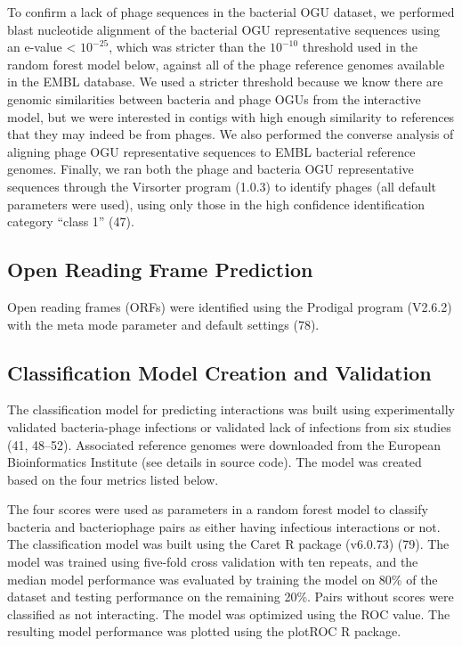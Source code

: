 \documentclass[12pt,]{article}
\begin{document}
To confirm a lack of phage sequences in the bacterial OGU dataset, we
performed blast nucleotide alignment of the bacterial OGU representative
sequences using an e-value \textless{} \(10^{-25}\), which was stricter
than the \(10^{-10}\) threshold used in the random forest model below,
against all of the phage reference genomes available in the EMBL
database. We used a stricter threshold because we know there are genomic
similarities between bacteria and phage OGUs from the interactive model,
but we were interested in contigs with high enough similarity to
references that they may indeed be from phages. We also performed the
converse analysis of aligning phage OGU representative sequences to EMBL
bacterial reference genomes. Finally, we ran both the phage and bacteria
OGU representative sequences through the Virsorter program (1.0.3) to
identify phages (all default parameters were used), using only those in
the high confidence identification category ``class 1'' (47).

\subsection{Open Reading Frame
Prediction}\label{open-reading-frame-prediction}

Open reading frames (ORFs) were identified using the Prodigal program
(V2.6.2) with the meta mode parameter and default settings (78).

\subsection{Classification Model Creation and
Validation}\label{classification-model-creation-and-validation}

The classification model for predicting interactions was built using
experimentally validated bacteria-phage infections or validated lack of
infections from six studies (41, 48--52). Associated reference genomes
were downloaded from the European Bioinformatics Institute (see details
in source code). The model was created based on the four metrics listed
below.

The four scores were used as parameters in a random forest model to
classify bacteria and bacteriophage pairs as either having infectious
interactions or not. The classification model was built using the Caret
R package (v6.0.73) (79). The model was trained using five-fold cross
validation with ten repeats, and the median model performance was
evaluated by training the model on 80\% of the dataset and testing
performance on the remaining 20\%. Pairs without scores were classified
as not interacting. The model was optimized using the ROC value. The
resulting model performance was plotted using the plotROC R package.
\end{document}
